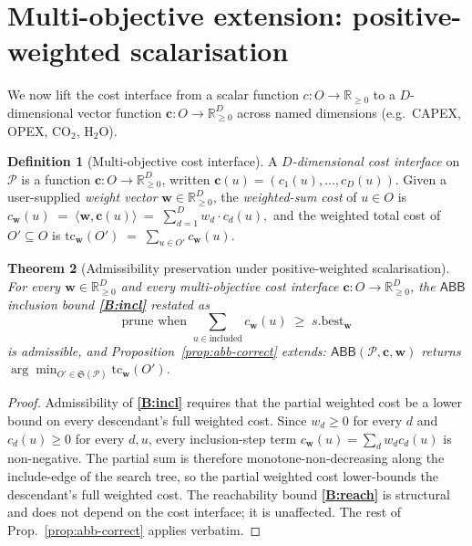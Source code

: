 \documentclass[11pt,a4paper]{article}
\theoremstyle{plain}
\newtheorem{theorem}{Theorem}
\theoremstyle{definition}
\newtheorem{definition}[theorem]{Definition}
\newcommand{\abb}{\textsf{ABB}}
\newcommand{\Real}{\mathbb{R}}
\newcommand{\Realp}{\Real_{\geq 0}}
\newcommand{\bw}{\boldsymbol{w}}
\newcommand{\bc}{\boldsymbol{c}}
\begin{document}
\section{Multi-objective extension: positive-weighted scalarisation}
\label{sec:multi-objective}

We now lift the cost interface from a scalar function
$c : O \to \Realp$ to a $D$-dimensional vector function
$\bc : O \to \Realp^D$ across named dimensions
(e.g.\ CAPEX, OPEX, CO$_2$, H$_2$O).

\begin{definition}[Multi-objective cost interface]
\label{def:multi-cost}
A \emph{$D$-dimensional cost interface} on $\mathcal{P}$ is a
function $\bc : O \to \Realp^D$, written
$\bc(u) = (c_1(u), \ldots, c_D(u))$. Given a user-supplied
\emph{weight vector} $\bw \in \Realp^D$, the
\emph{weighted-sum cost} of $u \in O$ is
$
c_{\bw}(u) \;=\; \langle \bw, \bc(u)\rangle
\;=\;\sum_{d=1}^{D} w_d \cdot c_d(u),
$
and the weighted total cost of $O' \subseteq O$ is
$
\mathrm{tc}_{\bw}(O') \;=\; \sum_{u \in O'} c_{\bw}(u).
$
\end{definition}

\begin{theorem}[Admissibility preservation under positive-weighted scalarisation]
\label{thm:admiss}
For every $\bw \in \Realp^D$ and every multi-objective cost
interface $\bc : O \to \Realp^D$, the $\abb$ inclusion bound
\textbf{\ref{B:incl}} restated as
\[
\text{prune when } \sum_{u \in \mathrm{included}} c_{\bw}(u)
\;\geq\; s.\mathrm{best}_{\bw}
\]
is admissible, and Proposition~\ref{prop:abb-correct} extends:
$\abb(\mathcal{P}, \bc, \bw)$ returns
$\arg\min_{O' \in \mathfrak{S}(\mathcal{P})} \mathrm{tc}_{\bw}(O')$.
\end{theorem}

\begin{proof}
Admissibility of \textbf{\ref{B:incl}} requires that the partial
weighted cost be a lower bound on every descendant's full weighted
cost. Since $w_d \geq 0$ for every $d$ and $c_d(u) \geq 0$ for every
$d, u$, every inclusion-step term
$c_{\bw}(u) = \sum_d w_d c_d(u)$ is non-negative. The partial sum
is therefore monotone-non-decreasing along the include-edge of the
search tree, so the partial weighted cost lower-bounds the
descendant's full weighted cost. The reachability bound
\textbf{\ref{B:reach}} is structural and does not depend on the
cost interface; it is unaffected. The rest of
Prop.~\ref{prop:abb-correct} applies verbatim.
\end{proof}
\end{document}
